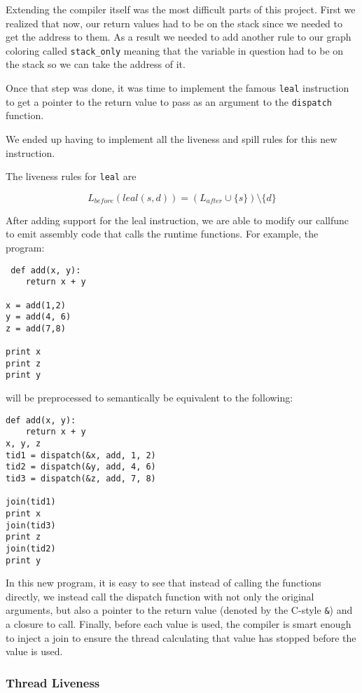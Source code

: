 \documentclass{acm_proc_article-sp}
\begin{document}
Extending the compiler itself was the most difficult parts of this project.
First we realized that now, our return values had to be on the stack since
we needed to get the address to them. As a result we needed to add another rule
to our graph coloring called \verb|stack_only| meaning that the variable in
question had to be on the stack so we can take the address of it.

Once that step was done, it was time to implement the famous \verb|leal| instruction
to get a pointer to the return value to pass as an argument to the \verb|dispatch|
function.

We ended up having to implement all the liveness and spill rules for this new instruction.

The liveness rules for \verb|leal| are

\[
L_{before}(leal(s,d)) = (L_{after} \cup \{s\}) \setminus \{d\}
\]

After adding support for the leal instruction, we are able to modify our callfunc
to emit assembly code that calls the runtime functions. For example, the program:

\begin{verbatim}
 def add(x, y):
	return x + y

x = add(1,2)
y = add(4, 6)
z = add(7,8)

print x
print z
print y
\end{verbatim}

will be preprocessed to semantically be equivalent to the following:

\begin{verbatim}
def add(x, y):
	return x + y
x, y, z
tid1 = dispatch(&x, add, 1, 2)
tid2 = dispatch(&y, add, 4, 6)
tid3 = dispatch(&z, add, 7, 8)

join(tid1)
print x
join(tid3)
print z
join(tid2)
print y
\end{verbatim}

In this new program, it is easy to see that instead of calling the functions directly,
we instead call the dispatch function with not only the original arguments, but also
a pointer to the return value (denoted by the C-style \verb|&|) and a closure to
call. Finally, before each value is used, the compiler is smart enough to inject a join
to ensure the thread calculating that value has stopped before the value is used.

\subsubsection*{Thread Liveness}
\end{document}
